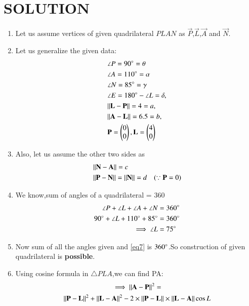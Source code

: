 \documentclass[journal,12pt,twocolumn]{IEEEtran}
\begin{document}
\section{SOLUTION}
\begin{enumerate}
\item Let us assume vertices of given quadrilateral $PLAN$ as $\vec{P}$,$\vec{L}$,$\vec{A}$ and $\vec{N}$.
\item Let us generalize the given data:
\begin{align}
&\angle P=90\degree=\theta \label{eq1}
\\
&\angle A=110\degree=\alpha
\\
&\angle N= 85\degree=\gamma \label{eq2}
\\
&\angle E=180\degree-\angle L=\delta,
\\
&\Vert\mathbf{L}-\mathbf{P}\rVert =4=a, \label{eq3}
\\
&\Vert\mathbf{A}-\mathbf{L}\rVert =6.5=b,\label{eq4}
\\
&\mathbf{P}=\begin{pmatrix}0\\0\end{pmatrix}, \mathbf{L}=\begin{pmatrix}4\\0\end{pmatrix} \label{eq5}
\end{align}
\item Also, let us assume the other two sides as
\begin{align}
 &\Vert\mathbf{N}-\mathbf{A}\rVert=c \label{eq6}
\\
&\Vert\mathbf{P}-\mathbf{N}\rVert=\Vert\mathbf{N}\rVert=d \quad(\because \mathbf{P}=0) \label{eq7}
\end{align}  
\item We know,sum of angles of a quadrilateral = 360\degree
\begin{align}
\angle P + \angle L +\angle A +\angle N &= 360\degree
\\
90 \degree + \angle L + 110 \degree + 85 \degree &= 360\degree
\\
\implies \angle L &= 75 \degree \label{eq8}
\end{align}
\item Now sum of all the angles given and \eqref{eq7} is $360\degree$.So construction of given quadrilateral is \textbf{possible}.
\item Using cosine formula in $\triangle PLA$,we can find  PA:
\begin{multline}
\implies {\Vert\mathbf{A}-\mathbf{P}\rVert^2}=
\\
{\Vert\mathbf{P}-\mathbf{L}\rVert^2}+ \Vert\mathbf{L}-\mathbf{A}\rVert^2-2\times\Vert\mathbf{P}-\mathbf{L}\rVert \times \Vert\mathbf{L}-\mathbf{A}\rVert\cos{L}
\end{multline}
\begin{align}

\end{align}
\end{enumerate}
\end{document}
